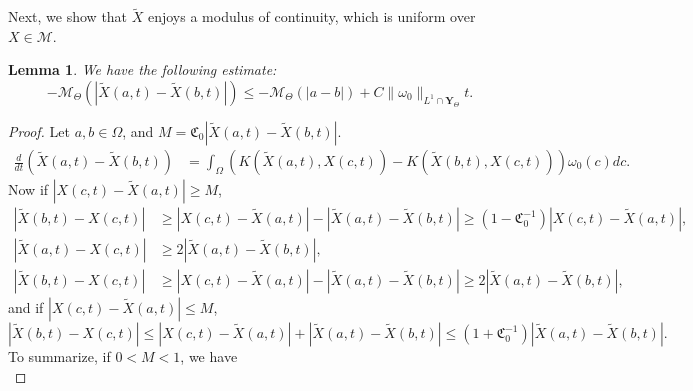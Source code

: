 \documentclass[12pt]{article}
\newtheorem{lemma}{Lemma}
\begin{document}
Next, we show that $\tilde{X}$ enjoys a modulus of continuity, which is uniform over $X \in \mathcal{M}$.
\begin{lemma} \label{Xregular}
We have the following estimate:
\begin{equation}
-\mathcal{M}_{\Theta} (|\tilde{X}(a,t) - \tilde{X} (b,t) | ) \le - \mathcal{M}_{\Theta} (|a-b| ) + C  \| \omega_0 \|_{L^1 \cap \mathbf{Y}_{\Theta} }t.
\end{equation}
\end{lemma}
\begin{proof}
Let $a, b \in \Omega$, and $M = \mathfrak{C}_0 |\tilde{X} (a,t) - \tilde{X} (b,t) |$. 
\begin{equation}
\begin{split}
\frac{d}{dt} (\tilde{X}(a,t) - \tilde{X} (b,t) ) &=  \int_{\Omega } \left ( K (\tilde{X}(a,t), X(c,t) ) - K(\tilde{X}(b,t), X(c,t) ) \right ) \omega_0 (c) dc.%
\end{split}
\end{equation}
Now if $|X(c,t) - \tilde{X}(a,t) | \ge M$, 
\begin{equation}
\begin{split}
|\tilde{X}(b,t) - X(c,t) | &\ge |X(c,t) - \tilde{X}(a,t) | - |\tilde{X}(a,t) - \tilde{X}(b,t) | \ge (1-\mathfrak{C}_0^{-1}) |X(c,t) - \tilde{X}(a,t) |, \\
|\tilde{X}(a,t) - X(c,t) | &\ge 2 | \tilde{X}(a,t) - \tilde{X}(b,t) |,  \\
|\tilde{X}(b,t) - X(c,t) | &\ge |X(c,t) - \tilde{X}(a,t) | - |\tilde{X}(a,t) - \tilde{X}(b,t) | \ge 2 |\tilde{X} (a,t) - \tilde{X}(b,t) |,
\end{split}
\end{equation}
and if $|X(c,t) - \tilde{X}(a,t) | \le M$,
\begin{equation}
|\tilde{X}(b,t) - X(c,t) | \le |X(c,t) - \tilde{X}(a,t) | + |\tilde{X}(a,t) - \tilde{X}(b,t) | \le (1+\mathfrak{C}_0^{-1}) |\tilde{X}(a,t) - \tilde{X}(b,t) |.
\end{equation}
To summarize, if $0 < M < 1$, we have
\begin{equation}

\end{equation}
\end{proof}
\end{document}

